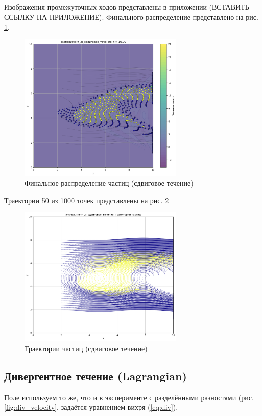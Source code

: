 Изображения промежуточных ходов представлены в приложении (ВСТАВИТЬ ССЫЛКУ НА ПРИЛОЖЕНИЕ).
Финального распределение представлено на рис. \ref{fig:lg_shaer_finall}.
\begin{figure}
	\centering
	\includegraphics[width=0.7\textwidth]{imgs/lg/эксперимент_2:_сдвиговое_течение_t10.00.png}
	\caption{Финальное распределение частиц (сдвиговое течение)}
	\label{fig:lg_shaer_finall}
\end{figure}
Траектории 50 из 1000 точек представлены на рис. \ref{fig:lg_shaer_tr}
\begin{figure}
	\centering
	\includegraphics[width=0.7\textwidth]{imgs/lg/эксперимент_2:_сдвиговое_течение_trajectories.png}
	\caption{Траектории частиц (сдвиговое течение)}
	\label{fig:lg_shaer_tr}
\end{figure}

\newpage
\subsection{Дивергентное течение (Lagrangian)}
Поле используем то же, что и в эксперименте с разделёнными разностями (рис. \ref{fig:div_velocity},  задаётся уравнением вихря (\ref{eq:div}).

